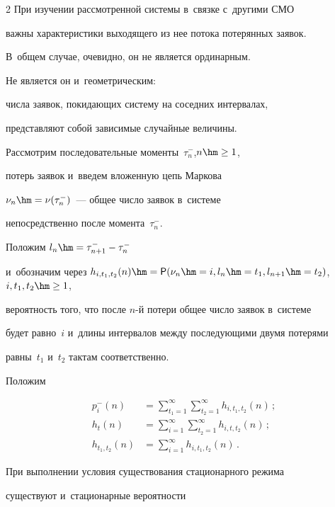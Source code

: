\begin{multicols}{2}
При изучении рассмотренной системы в~связке с~другими СМО


важны характеристики выходящего из нее потока потерянных заявок.


В~общем случае, очевидно, он не является ординарным.


Не является он и~геометрическим:


числа заявок, покидающих систему на соседних интервалах,


представляют собой зависимые случайные величины.








Рассмотрим последовательные моменты~$\tau^-_n$,\linebreak $n\hm\ge 1$,


потерь заявок и~введем вложенную цепь Маркова


$\nu_n\hm=\nu(\tau^-_n)$~--- общее число заявок в~системе


непосредственно после момента~$\tau^-_n$.


Положим $l_n\hm=\tau^-_{n+1}-\tau^-_n$


и~обозначим через ${h_{i,t_1,t_2}(n)\hm={\sf P} (\nu_n\hm=i, l_n\hm=t_1, 


l_{n+1}\hm=t_2)}$, $i, t_1,t_2 \hm\ge 1$,


вероятность того, что после $n$-й потери общее число заявок в~системе 


будет равно~$i$ и~длины интервалов между последующими двумя потерями 


равны~$t_1$ и~$t_2$ тактам соответственно. 


Положим


\begin{align*}


p_i^-(n)&=\sum\limits_{t_1=1}^\infty \sum\limits_{t_2=1}^\infty h_{i,t_1,t_2}(n)\,;\\


h_{t}(n)&=\sum\limits_{i=1}^\infty\sum\limits_{t_2=1}^\infty 


h_{i,t,t_2}(n)\,;\\


h_{t_1,t_2}(n)&=\sum\limits_{i=1}^\infty h_{i,t_1,t_2}(n)\,.


\end{align*}


При выполнении условия существования стационарного режима


существуют и~стационарные вероятности



\end{multicols}
